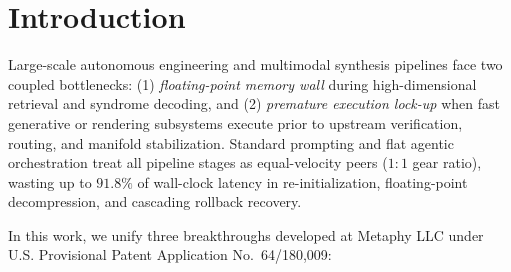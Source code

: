 \documentclass[10pt,twocolumn]{article}
\begin{document}
\section{Introduction}
Large-scale autonomous engineering and multimodal synthesis pipelines face two coupled bottlenecks: (1) \emph{floating-point memory wall} during high-dimensional retrieval and syndrome decoding, and (2) \emph{premature execution lock-up} when fast generative or rendering subsystems execute prior to upstream verification, routing, and manifold stabilization. Standard prompting and flat agentic orchestration treat all pipeline stages as equal-velocity peers ($1:1$ gear ratio), wasting up to $91.8\%$ of wall-clock latency in re-initialization, floating-point decompression, and cascading rollback recovery.

In this work, we unify three breakthroughs developed at Metaphy LLC under U.S. Provisional Patent Application No.\ 64/180,009:
\end{document}

